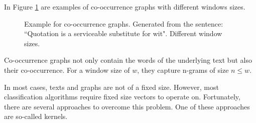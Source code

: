 In Figure \ref{fig:cooccurrence_graphs} are examples of co-occurrence graphs with different windows sizes.

\begin{figure}[ht]%
    \centering
    \caption{Example for co-occurrence graphs. Generated from the sentence: ``Quotation is a serviceable substitute for wit". Different window sizes.}%
    \label{fig:cooccurrence_graphs}%
\end{figure}

Co-occurrence graphs not only contain the words of the underlying text but also their co-occurrence.
For a window size of $w$, they capture n-grams of size $n \leq w$.

In most cases, texts and graphs are not of a fixed size.
However, most classification algorithms require fixed size vectors to operate on.
Fortunately, there are several approaches to overcome this problem.
One of these approaches are so-called kernels.

